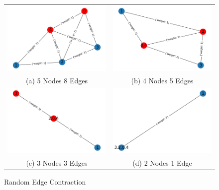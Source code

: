 \documentclass[longpaper, english, final, times]{revdetua}
\begin{document}
			\begin{figure}[h]
				\begin{tabular}{cc}
					\includegraphics[width=0.5\linewidth]{imgs/probrandexx1.png} &   \includegraphics[width=0.5\linewidth]{imgs/probrandexx2.png} \\
					(a) 5 Nodes 8 Edges & (b) 4 Nodes 5 Edges \\[6pt]
					\includegraphics[width=0.5\linewidth]{imgs/probrandexx3.png} &   \includegraphics[width=0.5\linewidth]{imgs/probrandexx4.png} \\
					(c) 3 Nodes 3 Edges & (d) 2 Nodes 1 Edge \\[6pt]
				\end{tabular}
				\caption{Random Edge Contraction}
				\label{figure:randomedgecontractionexample1}
			\end{figure}
			
\end{document}
